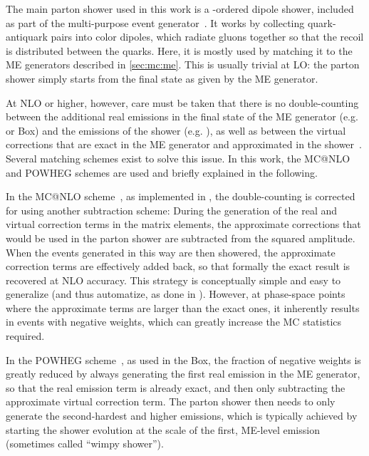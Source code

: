 The main parton shower used in this work is a \pt-ordered dipole shower, included as part of the \pythia multi-purpose event generator~\cite{Pythia:2015,Pythia:2022}. It works by collecting quark-antiquark pairs into color dipoles, which radiate gluons together so that the recoil is distributed between the quarks. Here, it is mostly used by matching it to the ME generators described in \cref{sec:mc:me}. This is usually trivial at LO: the parton shower simply starts from the final state as given by the ME generator.

At NLO or higher, however, care must be taken that there is no double-counting between the additional real emissions in the final state of the ME generator (e.g. \amcatnlo or \powheg Box) and the emissions of the shower (e.g. \pythia), as well as between the virtual corrections that are exact in the ME generator and approximated in the shower~\cite{Skands:2012ts}. Several matching schemes exist to solve this issue. In this work, the MC@NLO and POWHEG schemes are used and briefly explained in the following.

In the MC@NLO scheme~\cite{Frixione:2002ik}, as implemented in \amcatnlo, the double-counting is corrected for using another subtraction scheme: During the generation of the real and virtual correction terms in the matrix elements, the approximate corrections that would be used in the parton shower are subtracted from the squared amplitude. When the events generated in this way are then showered, the approximate correction terms are effectively added back, so that formally the exact result is recovered at NLO accuracy. This strategy is conceptually simple and easy to generalize (and thus automatize, as done in \amcatnlo). However, at phase-space points where the approximate terms are larger than the exact ones, it inherently results in events with negative weights, which can greatly increase the MC statistics required.

In the POWHEG scheme~\cite{Powheg:2004,Powheg:2007}, as used in the \powheg Box, the fraction of negative weights is greatly reduced by always generating the first real emission in the ME generator, so that the real emission term is already exact, and then only subtracting the approximate virtual correction term. The parton shower then needs to only generate the second-hardest and higher emissions, which is typically achieved by starting the shower evolution at the scale of the first, ME-level emission (sometimes called ``wimpy shower'').


